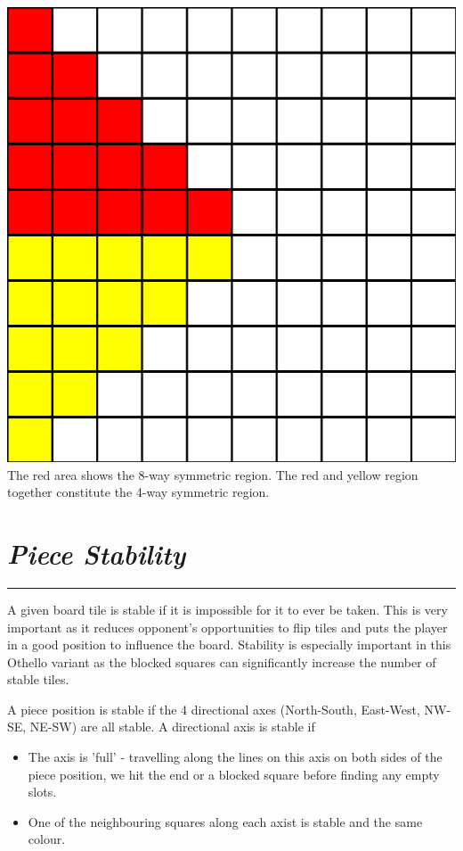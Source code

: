 \documentclass[10pt]{report}
\begin{document}
\begin{multicols}{2}
\begin{center}
\includegraphics[scale=0.25]{symmetries.png}\\
The red area shows the 8-way symmetric region. The red and yellow region together constitute the 4-way symmetric region.
\end{center}

\section*{\emph{\textmd{Piece Stability}}}
\hrule

A given board tile is stable if it is impossible for it to ever be taken. This is very important as it reduces opponent's opportunities to flip tiles and puts the player in a good position to influence the board. Stability is especially important in this Othello variant as the blocked squares can significantly increase the number of stable tiles. 

A piece position is stable if the 4 directional axes (North-South, East-West, NW-SE, NE-SW) are all stable. A directional axis is stable if
    \begin{itemize}
\item The axis is 'full' - travelling along the lines on this axis on both sides of the piece position, we hit the end or a blocked square before finding any empty slots.
\item One of the neighbouring squares along each axist is stable and the same colour.
\end{itemize}


\end{multicols}
\end{document}
